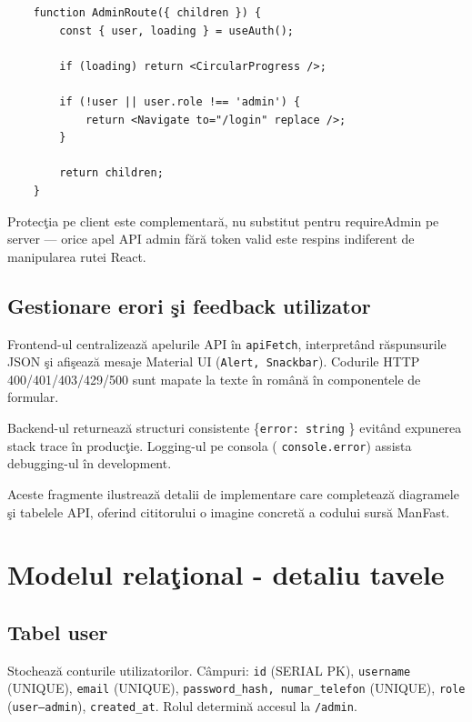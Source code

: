 \begin{lstlisting}
	function AdminRoute({ children }) {
		const { user, loading } = useAuth();
		
		if (loading) return <CircularProgress />;
		
		if (!user || user.role !== 'admin') {
			return <Navigate to="/login" replace />;
		}
		
		return children;
	}
\end{lstlisting}

Protec\c tia pe client este complementar\u a, nu substitut pentru requireAdmin pe server --- orice apel API admin f\u ar\u a token valid este respins indiferent de manipularea rutei React. 

\subsection{Gestionare erori \c si feedback utilizator}

Frontend-ul centralizeaz\u a apelurile API \^in \texttt{apiFetch}, interpret\^and r\u aspunsurile JSON \c si afi\c seaz\u a mesaje Material UI (\texttt{Alert, Snackbar}). Codurile HTTP 400/401/403/429/500 sunt mapate la texte \^in rom\^an\u a \^in componentele de formular.

Backend-ul returneaz\u a structuri consistente \{\texttt{error: string} \} evit\^and expunerea stack trace \^in produc\c tie. Logging-ul pe consola ( \texttt{console.error}) assista debugging-ul \^in development.

Aceste fragmente ilustreaz\u a detalii de implementare care completeaz\u a diagramele \c si tabelele API, oferind cititorului o imagine concret\u a a codului surs\u a ManFast. 

\section{Modelul rela\c tional - detaliu tavele}
\subsection{Tabel user}

Stocheaz\u a conturile utilizatorilor. C\^ampuri: \texttt{id} (SERIAL PK), \texttt{username} (UNIQUE), \texttt{email} (UNIQUE), \texttt{password\_hash, numar\_telefon} (UNIQUE), \texttt{role} \linebreak (\texttt{user---admin}), \texttt{created\_at}. Rolul determin\u a accesul la  \texttt{/admin}.

